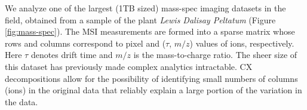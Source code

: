 We analyze one of the largest (1TB sized) mass-spec imaging datasets in the field, obtained from a sample of the plant {\it Lewis Dalisay Peltatum} (Figure \ref{fig:mass-spec}). The MSI measurements are formed into a sparse matrix whose rows and columns correspond to pixel and ($\tau$, $m/z$) values of ions, respectively. Here $\tau$ denotes drift time and $m/z$ is the mass-to-charge ratio. The sheer size of this dataset has previously made complex analytics intractable. CX decompositions allow for the possibility of identifying small numbers of columns (ions) in the original data that reliably explain a large portion of the variation in the data.


